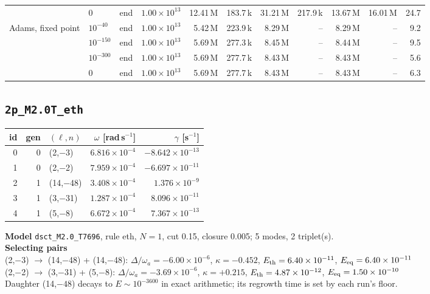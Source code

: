 {\begin{tabular}{@{}llllrrrrrrr@{}}
 & $0$ & end & $1.00\times10^{13}$ & 12.41\,M & 183.7\,k & 31.21\,M & 217.9\,k & 13.67\,M & 16.01\,M & 24.7 \\
\addlinespace[2pt]
Adams, fixed point & $10^{-40}$ & end & $1.00\times10^{13}$ & 5.42\,M & 223.9\,k & 8.29\,M & -- & 8.29\,M & -- & 9.2 \\
 & $10^{-150}$ & end & $1.00\times10^{13}$ & 5.69\,M & 277.3\,k & 8.45\,M & -- & 8.44\,M & -- & 9.5 \\
 & $10^{-300}$ & end & $1.00\times10^{13}$ & 5.69\,M & 277.7\,k & 8.43\,M & -- & 8.43\,M & -- & 5.6 \\
 & $0$ & end & $1.00\times10^{13}$ & 5.69\,M & 277.7\,k & 8.43\,M & -- & 8.43\,M & -- & 6.3 \\
\bottomrule
\end{tabular}}

\clearpage
\subsection{\texttt{2p\_M2.0T\_eth}}\label{net:2p_M2.0T_eth}
\noindent\begin{minipage}[t]{0.43\textwidth}\vspace{0pt}\footnotesize
\begin{tabular}{@{}rrlrr@{}}
\toprule
id & gen & $(\ell,n)$ & $\omega$ [rad\,s$^{-1}$] & $\gamma$ [s$^{-1}$] \\
\midrule
0 & 0 & (2,$-$3) & $6.816\times10^{-4}$ & $-8.642\times10^{-13}$ \\
1 & 0 & (2,$-$2) & $7.959\times10^{-4}$ & $-6.697\times10^{-11}$ \\
2 & 1 & (14,$-$48) & $3.408\times10^{-4}$ & $1.376\times10^{-9}$ \\
3 & 1 & (3,$-$31) & $1.287\times10^{-4}$ & $8.096\times10^{-11}$ \\
4 & 1 & (5,$-$8) & $6.672\times10^{-4}$ & $7.367\times10^{-13}$ \\
\bottomrule
\end{tabular}
\end{minipage}\hfill
\begin{minipage}[t]{0.55\textwidth}\vspace{0pt}\footnotesize
\textbf{Model} \texttt{dsct\_M2.0\_T7696}, rule eth, $N=1$, cut 0.15,
closure 0.005; 5 modes, 2 triplet(s).\\[2pt]
\textbf{Selecting pairs}\\ (2,$-$3) $\to$ (14,$-$48) + (14,$-$48): $\Delta/\omega_a=-6.00\times10^{-6}$, $\kappa=-0.452$, $E_{\rm th}=6.40\times10^{-11}$, $E_{\rm eq}=6.40\times10^{-11}$\\
(2,$-$2) $\to$ (3,$-$31) + (5,$-$8): $\Delta/\omega_a=-3.69\times10^{-6}$, $\kappa=+0.215$, $E_{\rm th}=4.87\times10^{-12}$, $E_{\rm eq}=1.50\times10^{-10}$\\[2pt]
Daughter (14,$-48$) decays to $E\sim10^{-3600}$ in exact arithmetic; its regrowth time is set by each run's floor.
\end{minipage}


